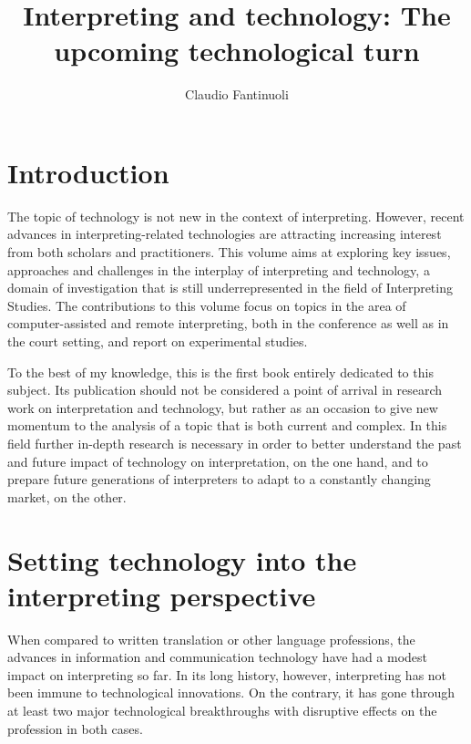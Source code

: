 \documentclass[output=paper]{langsci/langscibook}
\title{Interpreting and technology: The upcoming technological turn}
\author{Claudio Fantinuoli\affiliation{Mainz University}}
\begin{document}
\maketitle


 

 
\section{Introduction} 
 
The topic of technology is not new in the context of interpreting. However, recent advances in interpreting-related technologies are attracting increasing interest from both scholars and practitioners. This volume aims at exploring key issues, approaches and challenges in the interplay of interpreting and technology, a domain of investigation that is still underrepresented in the field of Interpreting Studies. The contributions to this volume focus on topics in the area of computer-assisted and remote interpreting, both in the conference as well as in the court setting, and report on experimental studies.
 
To the best of my knowledge, this is the first book entirely dedicated to this subject. Its publication should not be considered a point of arrival in research work on interpretation and technology, but rather as an occasion to give new momentum to the analysis of a topic that is both current and complex. In this field further in-depth research is necessary in order to better understand the past and future impact of technology on interpretation, on the one hand, and to prepare future generations of interpreters to adapt to a constantly changing market, on the other.
 
\section{Setting technology into the interpreting perspective} 
When compared to written translation or other language professions, the advances in information and communication technology have had a modest impact on interpreting so far. In its long history, however, interpreting has not been immune to technological innovations. On the contrary, it has gone through at least two major technological breakthroughs with disruptive effects on the profession in both cases. 
 
\end{document}
